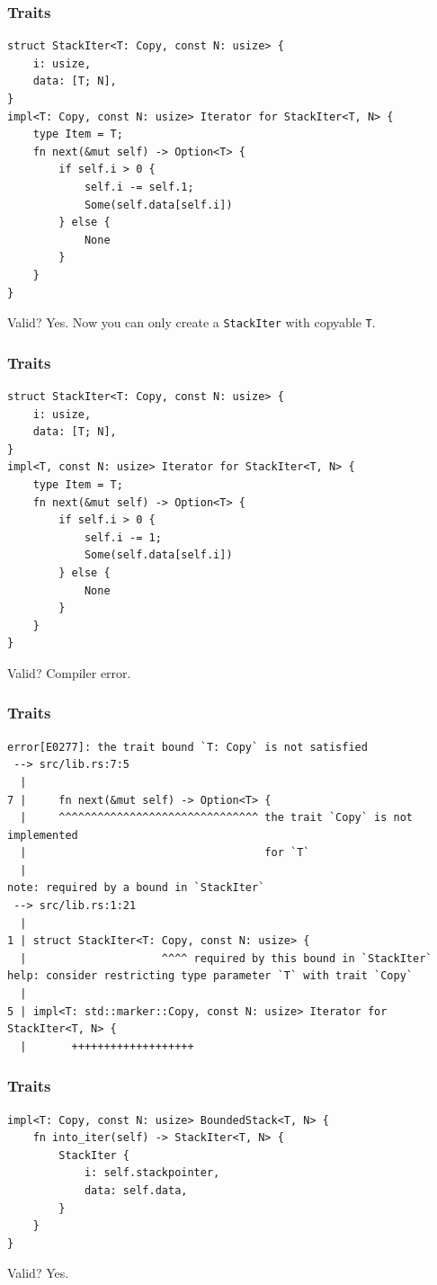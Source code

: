 \begin{frame}[fragile]
    \frametitle{Traits}
    \begin{verbatim}
struct StackIter<T: Copy, const N: usize> {
    i: usize,
    data: [T; N],
}
impl<T: Copy, const N: usize> Iterator for StackIter<T, N> {
    type Item = T;
    fn next(&mut self) -> Option<T> {
        if self.i > 0 {
            self.i -= self.1;
            Some(self.data[self.i])
        } else {
            None
        }
    }
}
    \end{verbatim}
    \pause
    \vfill
    Valid?
    \pause
    Yes. Now you can only create a \texttt{StackIter} with copyable \texttt{T}.
\end{frame}

\begin{frame}[fragile]
    \frametitle{Traits}
    \begin{verbatim}
struct StackIter<T: Copy, const N: usize> {
    i: usize,
    data: [T; N],
}
impl<T, const N: usize> Iterator for StackIter<T, N> {
    type Item = T;
    fn next(&mut self) -> Option<T> {
        if self.i > 0 {
            self.i -= 1;
            Some(self.data[self.i])
        } else {
            None
        }
    }
}
    \end{verbatim}
    \pause
    \vfill
    Valid?
    \pause
    Compiler error.
\end{frame}

\begin{frame}[fragile]
    \frametitle{Traits}
    \begin{verbatim}
error[E0277]: the trait bound `T: Copy` is not satisfied
 --> src/lib.rs:7:5
  |
7 |     fn next(&mut self) -> Option<T> {
  |     ^^^^^^^^^^^^^^^^^^^^^^^^^^^^^^^ the trait `Copy` is not implemented
  |                                     for `T`
  |
note: required by a bound in `StackIter`
 --> src/lib.rs:1:21
  |
1 | struct StackIter<T: Copy, const N: usize> {
  |                     ^^^^ required by this bound in `StackIter`
help: consider restricting type parameter `T` with trait `Copy`
  |
5 | impl<T: std::marker::Copy, const N: usize> Iterator for StackIter<T, N> {
  |       +++++++++++++++++++
    \end{verbatim}
\end{frame}

\begin{frame}[fragile]
    \frametitle{Traits}
    \begin{verbatim}
impl<T: Copy, const N: usize> BoundedStack<T, N> {
    fn into_iter(self) -> StackIter<T, N> {
        StackIter {
            i: self.stackpointer,
            data: self.data,
        }
    }
}
    \end{verbatim}
    \pause
    \vfill
    Valid?
    \pause
    Yes.
\end{frame}

